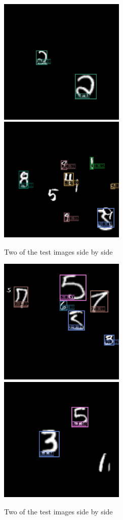 \documentclass{article}
\begin{document}
\begin{figure}[H]%
    \centering
    {{\includegraphics[width=6cm]{Assignments/Assignment_4/plots/0.png} }}%
    \qquad
    {{\includegraphics[width=6cm]{Assignments/Assignment_4/plots/1.png} }}%
    \caption{Two of the test images side by side}%
    \label{fig:test1}%
\end{figure}


\begin{figure}[H]%
    \centering
   {{\includegraphics[width=6cm]{Assignments/Assignment_4/plots/2.png} }}%
    \qquad
    {{\includegraphics[width=6cm]{Assignments/Assignment_4/plots/3.png} }}%
    \caption{Two of the test images side by side}%
    \label{fig:test}%
\end{figure}
\end{document}
